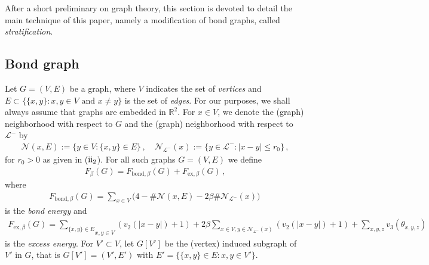 \documentclass[reqno]{amsart}
\theoremstyle{plain}
\theoremstyle{definition}
\numberwithin{equation}{section}
\newcommand{\R}{\mathbb{R}}
\begin{document}
After a short preliminary on graph theory, this section is devoted to  detail   the main technique of this paper, namely a modification of bond graphs, called \emph{stratification}. 


\subsection{Bond graph} \label{subsec:graph theory}   Let  $G=(V,E)$
be a graph, where $V$ indicates the set of \emph{vertices} and $E
\subset \{\{x,y\} \colon x,y \in V \text{ and } x\neq y \}$ is  the
set of \emph{edges}.  For our purposes, we shall always assume
that graphs are embedded in $\R^2$.  %
For $x \in V$, we denote the  (graph)  neighborhood with respect to $G$ and the  (graph)  neighborhood with respect to $\mathcal{L}^-$ by
\begin{align*}
\mathcal{N}(x,E) :=\{y \in V \colon \{x,y\} \in E\}\,, \quad \mathcal{N}_{\mathcal{L}^-}(x) :=\{y \in \mathcal{L}^- \colon |x-y|\leq r_0\}\,,
\end{align*}
  for $r_0>0$ as given in {\rm ($\rm{ii}_2$)}.  For all such graphs $G=(V,E)$ we define
\begin{align} 
\label{def:F}
F_\beta(G) = F_{\mathrm{bond},\beta}(G) + F_{\mathrm{ex},\beta}(G)\,,
\end{align}
where
\begin{align}
\label{def:Fbond}
F_{\mathrm{bond},\beta}(G) = \sum_{x \in V} \big(4-\#\mathcal{N}(x,E)- 2 \beta\#\mathcal{N}_{\mathcal{L}^-}(x) \big)\,
\end{align}
 is the \textit{bond energy} and  
\begin{align*}
 F_{\mathrm{ex},\beta}(G)  =  \underset{x,y\in V}{\sum_{\{x,y\} \in E}} (v_2(|x-y|)+1) +  2  \beta  \sum_{x\in V,y\in \mathcal{N}_{\mathcal{L}^-}(x) } (v_2(|x-y|)+1)+ \sum_{ x,y,z} v_3(\theta_{x,y,z})
\end{align*}
is the \textit{excess energy}. For $V'\subset V$,  let 
$G[V']$  be   the (vertex) induced subgraph of $V'$ in $G$, that is $G[V']= (V',E')$ with $E'= \{\{x,y\} \in E\colon x,y \in V'\}$. 
\end{document}

